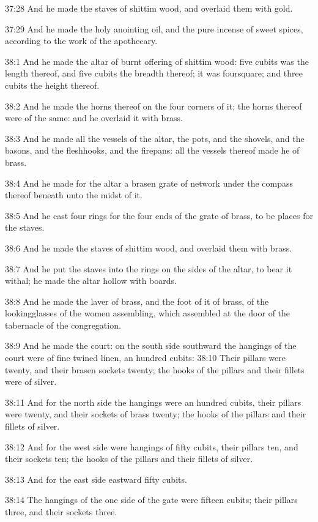 37:28 And he made the staves of shittim wood, and overlaid them with
gold.

37:29 And he made the holy anointing oil, and the pure incense of
sweet spices, according to the work of the apothecary.

38:1 And he made the altar of burnt offering of shittim wood: five
cubits was the length thereof, and five cubits the breadth thereof; it
was foursquare; and three cubits the height thereof.

38:2 And he made the horns thereof on the four corners of it; the
horns thereof were of the same: and he overlaid it with brass.

38:3 And he made all the vessels of the altar, the pots, and the
shovels, and the basons, and the fleshhooks, and the firepans: all the
vessels thereof made he of brass.

38:4 And he made for the altar a brasen grate of network under the
compass thereof beneath unto the midst of it.

38:5 And he cast four rings for the four ends of the grate of brass,
to be places for the staves.

38:6 And he made the staves of shittim wood, and overlaid them with
brass.

38:7 And he put the staves into the rings on the sides of the altar,
to bear it withal; he made the altar hollow with boards.

38:8 And he made the laver of brass, and the foot of it of brass, of
the lookingglasses of the women assembling, which assembled at the
door of the tabernacle of the congregation.

38:9 And he made the court: on the south side southward the hangings
of the court were of fine twined linen, an hundred cubits: 38:10 Their
pillars were twenty, and their brasen sockets twenty; the hooks of the
pillars and their fillets were of silver.

38:11 And for the north side the hangings were an hundred cubits,
their pillars were twenty, and their sockets of brass twenty; the
hooks of the pillars and their fillets of silver.

38:12 And for the west side were hangings of fifty cubits, their
pillars ten, and their sockets ten; the hooks of the pillars and their
fillets of silver.

38:13 And for the east side eastward fifty cubits.

38:14 The hangings of the one side of the gate were fifteen cubits;
their pillars three, and their sockets three.

